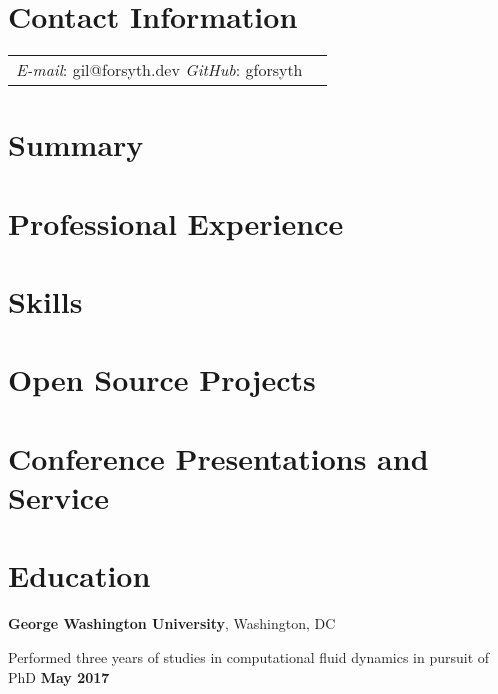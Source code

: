 \documentclass[margin,line]{res}
\newenvironment{list1}{
  \begin{list}{\ding{213}}{%
      \setlength{\itemsep}{0in}
      \setlength{\parsep}{0in} \setlength{\parskip}{0in}
      \setlength{\topsep}{0in} \setlength{\partopsep}{0in}
      \setlength{\leftmargin}{0.17in}}}{\end{list}}
\begin{document}
\newcommand{\link}[1]{\texttt{#1}}
\providecommand{\tightlist}{%
      \setlength{\itemsep}{0pt}\setlength{\parskip}{0pt}}


\renewcommand{\labelitemi}{\ding{213}}


\begin{resume}
\section{\sc Contact Information}
\vspace{.05in}
\begin{tabular}{@{}p{3in}p{4in}}
    {\it E-mail}:  gil@forsyth.dev \hfill
{\it GitHub}: gforsyth
\end{tabular}


\section{\sc Summary}



\section{\sc Professional Experience}



\section{\sc Skills}




\section{\sc Open Source Projects}



\section{\sc Conference Presentations and Service}



\section{\sc Education}
\textbf {George Washington University}, Washington, DC\\
\vspace*{-.1in}
\begin{list1}
\item[] Performed three years of studies in computational fluid dynamics in pursuit of PhD \hfill \textbf{ May 2017}
\end{list1}


\end{resume}
\end{document}

